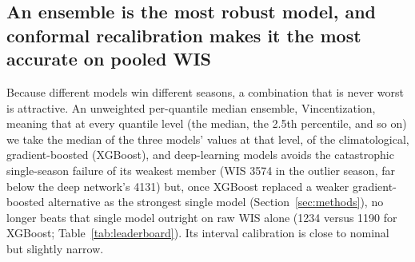 \documentclass[11pt]{article}
\begin{document}
\subsection{An ensemble is the most robust model, and conformal recalibration makes it the most
accurate on pooled WIS}\label{sec:conformal}
Because different models win different seasons, a combination that is never worst is attractive. An
unweighted per-quantile median ensemble, Vincentization, meaning that at every quantile level (the
median, the 2.5th percentile, and so on) we take the median of the three models' values at that
level, of the climatological, gradient-boosted (XGBoost),
and deep-learning models avoids the catastrophic single-season failure of its weakest member
(WIS 3574 in the outlier season, far below the deep network's 4131) but, once XGBoost replaced a
weaker gradient-boosted alternative as the strongest single model (Section~\ref{sec:methods}), no
longer beats that single model outright on raw WIS alone (1234 versus 1190 for XGBoost;
Table~\ref{tab:leaderboard}). Its interval calibration is close to nominal but slightly narrow.
\end{document}
